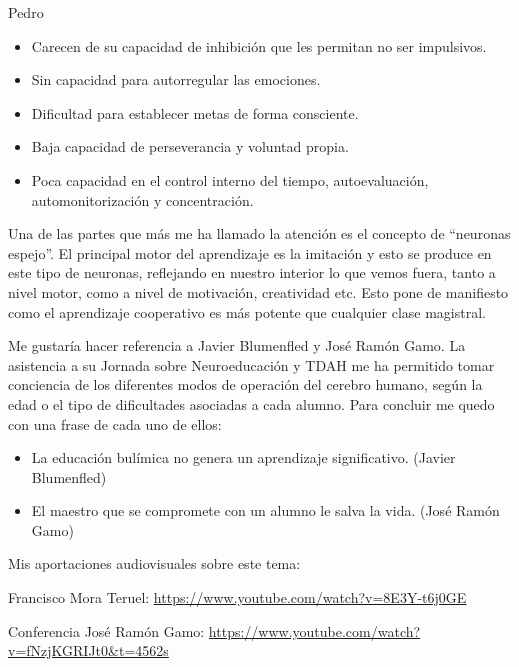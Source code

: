 \begin{opin}{\pedrocolor}{Pedro}
\begin{itemize}
\item Carecen de su capacidad de inhibición que les permitan no ser impulsivos. 

\item Sin capacidad para autorregular las emociones. 

\item Dificultad para establecer metas de forma consciente.  

\item Baja capacidad de perseverancia y voluntad propia. 

\item Poca capacidad en el control interno del tiempo, autoevaluación, automonitorización y  concentración. 

\end{itemize} 

 

Una de las partes que más me ha llamado la atención es el concepto de “neuronas espejo”. El principal motor del aprendizaje es la imitación y esto se produce en este tipo de neuronas, reflejando en nuestro interior lo que vemos fuera, tanto a nivel motor, como a nivel de motivación, creatividad etc. Esto pone de manifiesto como el aprendizaje cooperativo es más potente que cualquier clase magistral.

Me gustaría hacer referencia a Javier Blumenfled y José Ramón Gamo. La asistencia a su Jornada sobre Neuroeducación y TDAH me ha permitido tomar conciencia de los diferentes modos de operación del cerebro humano, según la edad o el tipo de dificultades asociadas a cada alumno. Para concluir me quedo con una frase de cada uno de ellos:

\begin{itemize}

\item La educación bulímica no genera un aprendizaje significativo. (Javier Blumenfled) 

\item El maestro que se compromete con un alumno le salva la vida.  (José Ramón Gamo) 
\end{itemize}
 

Mis aportaciones audiovisuales sobre este tema:

Francisco Mora Teruel: \url{https://www.youtube.com/watch?v=8E3Y-t6j0GE}   

Conferencia José Ramón Gamo: \url{https://www.youtube.com/watch?v=fNzjKGRIJt0&t=4562s}

\end{opin}

